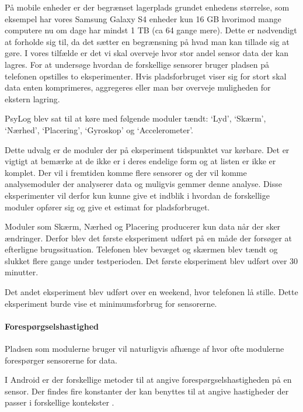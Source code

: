 På mobile enheder er der begrænset lagerplads grundet enhedens størrelse, som eksempel har vores Samsung Galaxy S4 enheder kun 16 GB hvorimod mange computere nu om dage har mindst 1 TB (ca 64 gange mere).
Dette er nødvendigt at forholde sig til, da det sætter en begrænsning på hvad man kan tillade sig at gøre.
I vores tilfælde er det vi skal overveje hvor stor andel sensor data der kan lagres.
For at undersøge hvordan de forskellige sensorer bruger pladsen på telefonen opstilles to eksperimenter.
Hvis pladsforbruget viser sig for stort skal data enten komprimeres, aggregeres eller man bør overveje muligheden for ekstern lagring.

PsyLog blev sat til at køre med følgende moduler tændt: `Lyd', `Skærm', `Nærhed', `Placering', `Gyroskop' og `Accelerometer'.

Dette udvalg er de moduler der på eksperiment tidspunktet var kørbare.
Det er vigtigt at bemærke at de ikke er i deres endelige form og at listen er ikke er komplet.
Der vil i fremtiden komme flere sensorer og der vil komme analysemoduler der analyserer data og muligvis gemmer denne analyse.
Disse eksperimenter vil derfor kun kunne give et indblik i hvordan de forskellige moduler opfører sig og give et estimat for pladsforbruget.

Moduler som Skærm, Nærhed og Placering producerer kun data når der sker ændringer. 
Derfor blev det første eksperiment udført på en måde der forsøger at efterligne brugssituation. 
Telefonen blev bevæget og skærmen blev tændt og slukket flere gange under testperioden.
Det første eksperiment blev udført over 30 minutter.

Det andet eksperiment blev udført over en weekend, hvor telefonen lå stille.
Dette eksperiment burde vise et minimumsforbrug for sensorerne.

\paragraph{Forespørgselshastighed}
Pladsen som modulerne bruger vil naturligvis afhænge af hvor ofte modulerne forespørger sensorerne for data.

I Android er der forskellige metoder til at angive forespørgselshastigheden på en sensor.
Der findes fire konstanter der kan benyttes til at angive hastigheder der passer i forskellige kontekster \cite{sensormonitor}.

